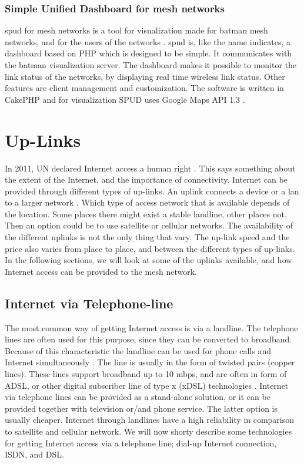 \subsubsection{Simple Unified Dashboard for mesh networks}
\gls{spud} for mesh networks is a tool for visualization made for \gls{batman} mesh networks, and for the users of the networks \cite{spud}. \gls{spud} is, like the name indicates, a dashboard based on PHP which is designed to be simple. It communicates with the \gls{batman} visualization server. The dashboard makes it possible to monitor the link status of the networks, by displaying real time wireless link status. Other features are client management and customization. The software is written in CakePHP and for visualization SPUD uses Google Maps API 1.3 \cite{spud}.

\section{Up-Links}
In 2011, UN declared Internet access a human right \cite{HR}. This says something about the extent of the Internet, and the importance of connectivity. Internet can be provided through different types of up-links. An uplink connects a device or a \gls{lan} to a larger network \cite{uplink}. Which type of access network that is available depends of the location. Some places there might exist a stable landline, other places not. Then an option could be to use satellite or cellular networks. The availability of the different uplinks is not the only thing that vary. The up-link speed and the price also varies from place to place, and between the different types of up-links. In the following sections, we will look at some of the uplinks available, and how Internet access can be provided to the mesh network.  

\subsection{Internet via Telephone-line}
The most common way of getting Internet access is via a landline. The telephone lines are often used for this purpose, since they can be converted to broadband. Because of this characteristic the landline can be used for phone calls and Internet simultaneously \cite{internet}. The line is usually in the form of twisted pairs (copper lines). These lines support broadband up to 10 \gls{mbps}, and are often in form of ADSL, or other digital subscriber line of type x (xDSL) technologies \cite{audestad}. Internet via telephone lines can be provided as a stand-alone solution, or it can be provided together with television or/and phone service. The latter option is usually cheaper. Internet through landlines have a high reliability \cite{cablevssatellite} in comparison to satellite and cellular network. We will now shorty describe some technologies for getting Internet access via a telephone line; dial-up Internet connection, ISDN, and DSL. 

